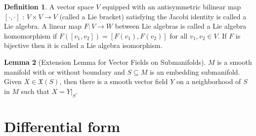\documentclass[12pt,a4paper]{book}
\theoremstyle{definition}
\newtheorem{defn}{Definition}[section]
\newtheorem{lem}[defn]{Lemma}
\begin{document}
\begin{defn}
    A vector space $V$ equipped with an antisymmetric bilinear map $[\cdot, \cdot]$ : $V \times V \rightarrow V$ (called a Lie bracket) satisfying the Jacobi identity is called a Lie algebra. A linear map $F: V \rightarrow W$ between Lie algebras
    is called a Lie algebra homomorphism if $F\left(\left[v_1, v_2\right]\right)=\left[F\left(v_1\right), F\left(v_2\right)\right]$ for all $v_1, v_2 \in V$. If $F$ is bijective then it is called a Lie algebra isomorphism.
\end{defn}
\begin{lem}[Extension Lemma for Vector Fields on Submanifolds]
    $M$ is a smooth manifold with or without boundary and $S \subseteq M$ is an embedding submanifold.
    Given $X \in \mathfrak{X}(S)$, then there is a smooth vector field $Y$ on a
    neighborhood of $S$ in $M$ such that $X=\left.Y\right|_S$.
    \label{lemma:Extension Lemma for Vector Fields on Submanifolds}
\end{lem}
\section{Differential form}
\end{document}
